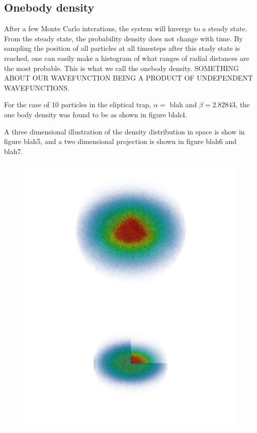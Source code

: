 \documentclass[english, a4paper]{article}
\begin{document}
\subsection{Onebody density}
After a few Monte Carlo interations, the system will knverge to a steady state.
From the steady state, the probability density does not change with time. 
By sampling the position of all particles at all timesteps after this stady state is 
reached, one can easily make a histogram of what ranges of radial distances are the most probable.
This is what we call the onebody density. SOMETHING ABOUT OUR WAVEFUNCTION BEING A PRODUCT OF UNDEPENDENT WAVEFUNCTIONS.

For the case of 10 particles in the eliptical trap, $\alpha = $ blah and $\beta = 2.82843$, the one body density was found to be as shown in figure blah4.

A three dimensional illustration of the density distribution in space is show in figure blah5,
and a two dimensional projection is shown in figure blah6 and blah7.
\begin{figure}[H]
\begin{minipage}[t]{0.48\linewidth}
  \includegraphics[width=\textwidth]{../modifiedMortenCode/figures/interactingDistribution3.png}
  \caption{}
  \label{fig:minipage1}
\end{minipage}
\quad
\begin{minipage}[t]{0.48\linewidth}
\includegraphics[width=\textwidth]{../modifiedMortenCode/figures/interactingDistributionXZ.png}
  \caption{}
  \label{fig:minipage1}
\end{minipage}
\end{figure}
\end{document}
